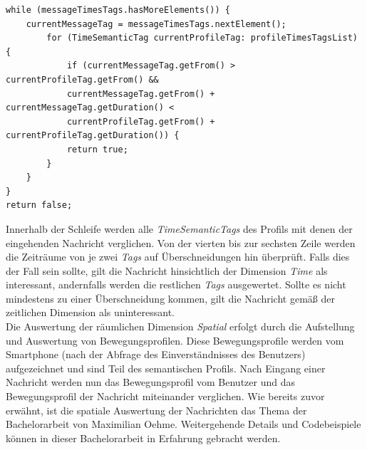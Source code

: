 \lstset{language=Java, caption=Auswertung der Time-Dimension (Auszug), label=DescriptiveLabel, numbers=left, numbersep=1em, breaklines=true, basicstyle=\small}
\begin{lstlisting}
while (messageTimesTags.hasMoreElements()) {
	currentMessageTag = messageTimesTags.nextElement();
		for (TimeSemanticTag currentProfileTag: profileTimesTagsList) {
			if (currentMessageTag.getFrom() > currentProfileTag.getFrom() &&
			currentMessageTag.getFrom() + currentMessageTag.getDuration() <
			currentProfileTag.getFrom() + currentProfileTag.getDuration()) {
			return true;
		}
	}
}
return false;
\end{lstlisting}
Innerhalb der Schleife werden alle \textit{TimeSemanticTags} des Profils mit denen der eingehenden Nachricht verglichen. Von der vierten bis zur sechsten Zeile werden die Zeiträume von je zwei \textit{Tags} auf Überschneidungen hin überprüft. Falls dies der Fall sein sollte, gilt die Nachricht hinsichtlich der Dimension \textit{Time} als interessant, andernfalls werden die restlichen \textit{Tags} ausgewertet. Sollte es nicht mindestens zu einer Überschneidung kommen, gilt die Nachricht gemäß der zeitlichen Dimension als uninteressant.
\\Die Auswertung der räumlichen Dimension \textit{Spatial} erfolgt durch die Aufstellung und Auswertung von Bewegungsprofilen. Diese Bewegungsprofile werden vom Smartphone (nach der Abfrage des Einverständnisses des Benutzers) aufgezeichnet und sind Teil des semantischen Profils. Nach Eingang einer Nachricht werden nun das Bewegungsprofil vom Benutzer und das Bewegungsprofil der Nachricht miteinander verglichen. Wie bereits zuvor erwähnt, ist die spatiale Auswertung der Nachrichten das Thema der Bachelorarbeit von Maximilian Oehme. Weitergehende Details und Codebeispiele können in dieser Bachelorarbeit in Erfahrung gebracht werden.

